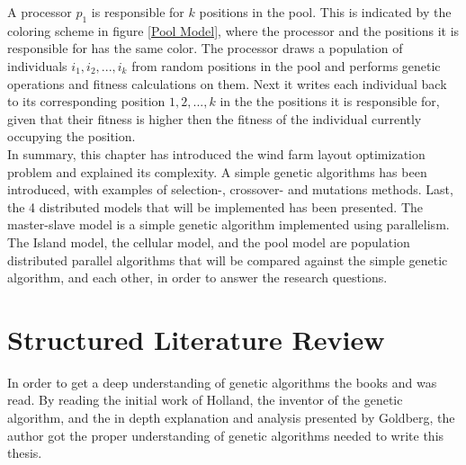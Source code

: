 \noindent A processor $p_1$ is responsible for $k$ positions in the pool. This is indicated by the coloring scheme in figure \ref{Pool Model}, where the processor and the positions it is responsible for has the same color. The processor draws a population of individuals $i_1, i_2,...,i_k$ from random positions in the pool and performs genetic operations and fitness calculations on them. Next it writes each individual back to its corresponding position $1, 2,...,k$ in the the positions it is responsible for, given that their fitness is higher then the fitness of the individual currently occupying the position.\\


\noindent In summary, this chapter has introduced the wind farm layout optimization problem and explained its complexity. A simple genetic algorithms has been introduced, with examples of selection-, crossover- and mutations methods. Last, the 4 distributed models that will be implemented has been presented. The master-slave model is a simple genetic algorithm implemented using parallelism. The Island model, the cellular model, and the pool model are population distributed parallel algorithms that  will be compared against the simple genetic algorithm, and each other, in order to answer the research questions. 


\section{Structured Literature Review}\label{section:slr}
In order to get a deep understanding of genetic algorithms the books \cite{Holland} and \cite{Goldberg} was read. By reading the initial work of Holland, the inventor of the genetic algorithm, and the in depth explanation and analysis presented by Goldberg, the author got the proper understanding of genetic algorithms needed to write this thesis.\\


